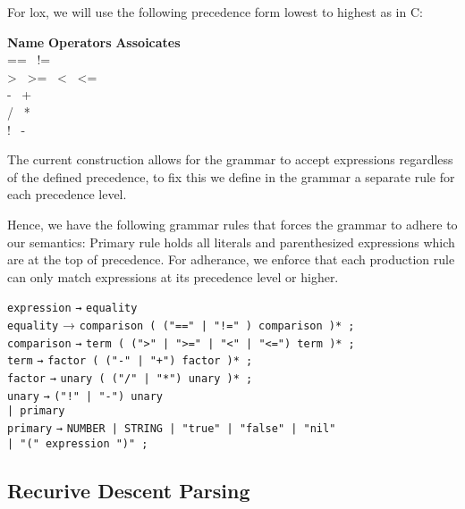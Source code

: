 \documentclass[12pt,a4paper]{article}
\newcommand{\newpar} {
  \vspace{1em}
  \noindent
}
\begin{document}
\newpar
For lox, we will use the following precedence form lowest to highest as in C:
\begin{tabbing}
	\textbf{Name}  \hspace{8em} \= \textbf{Operators} \hspace{8em} \=  \textbf{Assoicates} \\
	\>   == \ != \> \\
	\>   > \ >= \ < \ <= \> \\
	\>   - \ +  \> \\
	\>   / \ * \> \\
	\>   ! \ - \> 
\end{tabbing}

\newpar
The current construction allows for the grammar to accept expressions regardless
of the defined precedence, to fix this we define in the grammar a separate rule
for each precedence level.

\newpar
Hence, we have the following grammar rules that forces the grammar to adhere to our semantics:
Primary rule holds all literals and parenthesized expressions which are at the top of precedence.
For adherance, we enforce that each production rule can only match expressions at its precedence level or higher.

\begin{tabbing}
	\texttt{expression}  \quad \= \texttt{→} \= \texttt{equality }  \\
	\texttt{equality} {→} \> \texttt{comparison ( ("==" | "!=" )  comparison )* ;} \\
	\texttt{comparison} \> \texttt{→} \> \texttt{term ( (">" | ">=" | "<" | "<=") term )* ;} \\
	\texttt{term} \> \texttt{→} \> \texttt{factor ( ("-" | "+") factor )* ;} \\
	\texttt{factor} \> \texttt{→} \> \texttt{unary ( ("/" | "*") unary )* ;} \\
	\texttt{unary} \> \texttt{→} \> \texttt{("!" | "-") unary }  \\
	\>  \texttt{| primary} \> \\
	\texttt{primary} \> \texttt{→} \>\texttt{NUMBER | STRING | "true" | "false" | "nil"} \\
	\>   \texttt{| "(" expression ")" ;}  \>
\end{tabbing}

\subsection{Recurive Descent Parsing}
\end{document}
